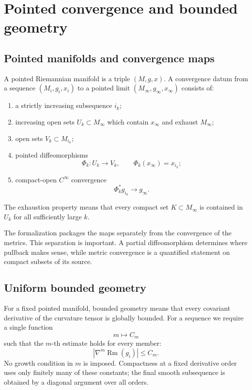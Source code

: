 \documentclass[11pt]{article}
\theoremstyle{plain}
\theoremstyle{definition}
\theoremstyle{remark}
\newcommand{\Rm}{\operatorname{Rm}}
\newcommand{\norm}[1]{\left|#1\right|}
\begin{document}
\section{Pointed convergence and bounded geometry}

\subsection{Pointed manifolds and convergence maps}

A pointed Riemannian manifold is a triple \((M,g,x)\).  A convergence datum
from a sequence \((M_i,g_i,x_i)\) to a pointed limit
\((M_\infty,g_\infty,x_\infty)\) consists of:
\begin{enumerate}[leftmargin=2em]
  \item a strictly increasing subsequence \(i_k\);
  \item increasing open sets \(U_k\subset M_\infty\) which contain
  \(x_\infty\) and exhaust \(M_\infty\);
  \item open sets \(V_k\subset M_{i_k}\);
  \item pointed diffeomorphisms
  \[
    \Phi_k:U_k\longrightarrow V_k,
    \qquad \Phi_k(x_\infty)=x_{i_k};
  \]
  \item compact-open \(C^\infty\) convergence
  \[
    \Phi_k^*g_{i_k}\longrightarrow g_\infty.
  \]
\end{enumerate}
The exhaustion property means that every compact set \(K\subset M_\infty\)
is contained in \(U_k\) for all sufficiently large \(k\).

The formalization packages the maps separately from the convergence of the
metrics.  This separation is important.  A partial diffeomorphism determines
where pullback makes sense, while metric convergence is a quantified
statement on compact subsets of its source.

\subsection{Uniform bounded geometry}

For a fixed pointed manifold, bounded geometry means that every covariant
derivative of the curvature tensor is globally bounded.  For a sequence we
require a single function
\[
  m\longmapsto C_m
\]
such that the \(m\)-th estimate holds for every member:
\[
  \norm{\nabla^m\Rm(g_i)}\leq C_m.
\]
No growth condition in \(m\) is imposed.  Compactness at a fixed derivative
order uses only finitely many of these constants; the final smooth
subsequence is obtained by a diagonal argument over all orders.
\end{document}
